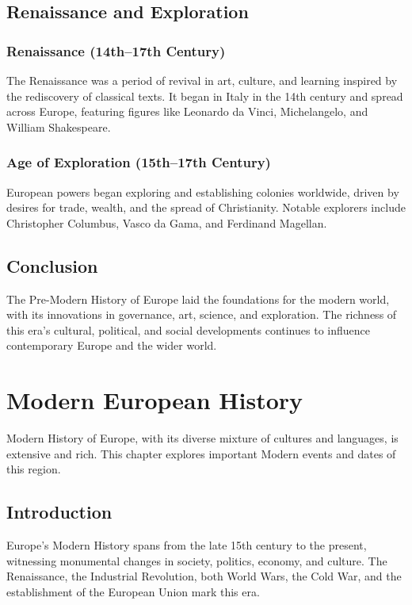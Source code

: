 \documentclass[a4paper,12pt]{book}
\begin{document}
\section{Renaissance and Exploration}
\label{sec:renaissance-exploration}
\subsection{Renaissance (14th–17th Century)}
The Renaissance was a period of revival in art, culture, and learning inspired by the rediscovery of classical texts. It began in Italy in the 14th century and spread across Europe, featuring figures like Leonardo da Vinci, Michelangelo, and William Shakespeare.

\subsection{Age of Exploration (15th–17th Century)}
European powers began exploring and establishing colonies worldwide, driven by desires for trade, wealth, and the spread of Christianity. Notable explorers include Christopher Columbus, Vasco da Gama, and Ferdinand Magellan.

\section{Conclusion}
\label{sec:conclusion-pre-modern-europe}
The Pre-Modern History of Europe laid the foundations for the modern world, with its innovations in governance, art, science, and exploration. The richness of this era’s cultural, political, and social developments continues to influence contemporary Europe and the wider world.

\chapter{Modern European History}
\label{ch:modern-european-history}

Modern History of Europe, with its diverse mixture of cultures and languages, is extensive and rich. This chapter explores important Modern events and dates of this region.

\section{Introduction}
\label{sec:introduction-modern-europe}
Europe's Modern History spans from the late 15th century to the present, witnessing monumental changes in society, politics, economy, and culture. The Renaissance, the Industrial Revolution, both World Wars, the Cold War, and the establishment of the European Union mark this era.
\end{document}
